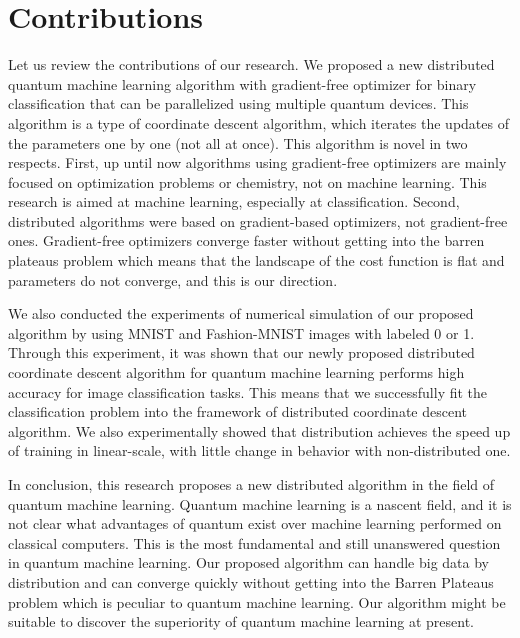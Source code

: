 \section{Contributions}
\par Let us review the contributions of our research. We proposed a new distributed quantum machine learning algorithm with gradient-free optimizer for binary classification that can be parallelized using multiple quantum devices. This algorithm is a type of coordinate descent algorithm, which iterates the updates of the parameters one by one (not all at once). This algorithm is novel in two respects. First, up until now algorithms using gradient-free optimizers are mainly focused on optimization problems or chemistry, not on machine learning. This research is aimed at machine learning, especially at classification. Second, distributed algorithms were based on gradient-based optimizers, not gradient-free ones. Gradient-free optimizers converge faster without getting into the barren plateaus problem which means that the landscape of the cost function is flat and parameters do not converge, and this is our direction. 


\par We also conducted the experiments of numerical simulation of our proposed algorithm by using MNIST and Fashion-MNIST images with labeled 0 or 1. Through this experiment, it was shown that our newly proposed distributed coordinate descent algorithm for quantum machine learning performs high accuracy for image classification tasks. This means that we successfully fit the classification problem into the framework of distributed coordinate descent algorithm. We also experimentally showed that distribution achieves the speed up of training in linear-scale, with little change in behavior with non-distributed one.


\par In conclusion, this research proposes a new distributed algorithm in the field of quantum machine learning. Quantum machine learning is a nascent field, and it is not clear what advantages of quantum exist over machine learning performed on classical computers. This is the most fundamental and still unanswered question in quantum machine learning. Our proposed algorithm can handle big data by distribution  and can converge quickly without getting into the Barren Plateaus problem which is peculiar to quantum machine learning. Our algorithm might be suitable to discover the superiority of quantum machine learning at present.